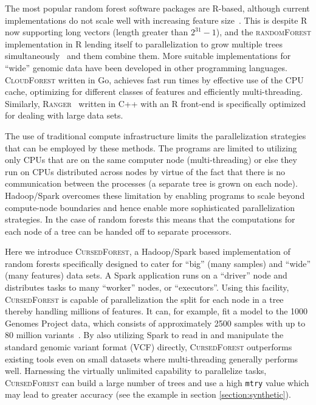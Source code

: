 \documentclass[10pt,letterpaper]{article}
\newcommand{\cursedforest}{\textsc{CursedForest}\xspace}
\newcommand{\ranger}{\textsc{Ranger}\xspace}
\newcommand{\randomforest}{\textsc{randomForest}\xspace}
\newcommand{\mtry}{\texttt{mtry}\xspace}
\begin{document}
The most popular random forest software packages are R-based, although current implementations do not scale well with
increasing feature size~\cite{Wright.and.Ziegle.2016}.  This is despite R now supporting long vectors (length greater
than $2^{31}-1$), and the \randomforest implementation in R lending itself to parallelization to grow multiple
trees simultaneously~\cite{Liaw.and.Weiner.2002} and them combine them.  More suitable implementations for ``wide''
genomic data have been developed in other programming languages. \textsc{CloudForest} \cite{Bressler2015} written in Go,
achieves fast run times by effective use of the CPU cache, optimizing for different classes of features and efficiently
multi-threading.  Similarly, \ranger~\cite{Wright.and.Ziegle.2016} written in C++ with an R front-end is
specifically optimized for dealing with large data sets.

The use of traditional compute infrastructure limits the parallelization strategies that can be employed by  
these methods.  The programs are limited to utilizing only CPUs that are on the same computer node (multi-threading) or
else they run on CPUs distributed across nodes by virtue of the fact that there is no communication between the
processes (a separate tree is grown on each node).  Hadoop/Spark overcomes these limitation by enabling programs to
scale beyond compute-node boundaries and hence enable more sophisticated parallelization strategies.  In the case of
random forests this means that the computations for each node of a tree can be handed off to separate processors.
  
Here we introduce \cursedforest, a Hadoop/Spark based implementation of random forests specifically designed to cater
for ``big'' (many samples) and ``wide'' (many features) data sets. A Spark application runs on a ``driver'' node and
distributes tasks to many ``worker'' nodes, or ``executors''. Using this facility, \cursedforest is capable of
parallelization the split for each node in a tree thereby handling millions of features. It can, for example, fit a
model to the 1000 Genomes Project data, which consists of approximately 2500 samples with up to 80 million
variants~\cite{1KG2012}.  By also utilizing Spark to read in and manipulate the standard genomic variant format (VCF)
directly, \cursedforest outperforms existing tools even on small datasets where multi-threading generally performs
well. Harnessing the virtually unlimited capability to parallelize tasks, \cursedforest can build a large number of
trees and use a high \mtry value which may lead to greater accuracy (see the example in section \ref{section:synthetic}). 
\end{document}
